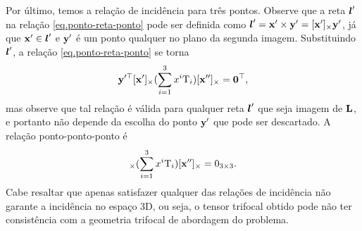 Por último, temos a relação de incidência para três pontos. 
Observe que a reta $\boldsymbol{l}'$ na relação \ref{eq.ponto-reta-ponto} pode ser definida como $\boldsymbol{l}'=\mathbf{x}'\times {\bf y}'=[\mathbf{x}']_\times {\bf y}'$, já que $\mathbf{x}'\in\boldsymbol{l}'$ e ${\bf y}'$ é um ponto qualquer no plano da segunda imagem. Substituindo $\boldsymbol{l}'$, a relação \ref{eq.ponto-reta-ponto} se torna 
\begin{equation*}
{\bf y}'^\top[\mathbf{x}']_\times(\sum_{i=1}^3 x^i\mbox{T}_i)[\mathbf{x}'']_\times={\bf 0}^\top,
\end{equation*}
mas observe que tal relação é válida para qualquer reta $\boldsymbol{l}'$ que seja imagem de ${\bf L}$, e portanto não depende da escolha do ponto ${\bf y}'$ que pode ser descartado. A relação ponto-ponto-ponto é
\begin{equation*}
[\x']_\times(\sum_{i=1}^3 x^i\mbox{T}_i)[\x'']_\times=0_{3\times3}.
\end{equation*}
Cabe resaltar que apenas satisfazer qualquer das relações de incidência não garante a incidência no espaço 3D, ou seja, o tensor trifocal obtido pode não ter consistência com a geometria trifocal de abordagem do problema.

